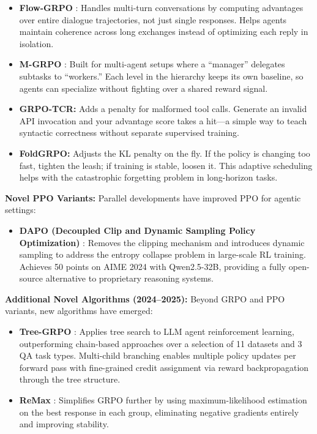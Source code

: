 \documentclass[12pt,a4paper]{report}
\theoremstyle{definition}
\begin{document}
\begin{itemize}
    \item \textbf{Flow-GRPO} \cite{li2025flowgrpo}: Handles multi-turn conversations by computing advantages over entire dialogue trajectories, not just single responses. Helps agents maintain coherence across long exchanges instead of optimizing each reply in isolation.

    \item \textbf{M-GRPO} \cite{hong2025mgrpo}: Built for multi-agent setups where a ``manager'' delegates subtasks to ``workers.'' Each level in the hierarchy keeps its own baseline, so agents can specialize without fighting over a shared reward signal.

    \item \textbf{GRPO-TCR:} Adds a penalty for malformed tool calls. Generate an invalid API invocation and your advantage score takes a hit---a simple way to teach syntactic correctness without separate supervised training.

    \item \textbf{FoldGRPO:} Adjusts the KL penalty on the fly. If the policy is changing too fast, tighten the leash; if training is stable, loosen it. This adaptive scheduling helps with the catastrophic forgetting problem in long-horizon tasks.
\end{itemize}

\noindent\textbf{Novel PPO Variants:} Parallel developments have improved PPO for agentic settings:
\begin{itemize}
    \item \textbf{DAPO (Decoupled Clip and Dynamic Sampling Policy Optimization)} \cite{bytedance2025dapo}: Removes the clipping mechanism and introduces dynamic sampling to address the entropy collapse problem in large-scale RL training. Achieves 50 points on AIME 2024 with Qwen2.5-32B, providing a fully open-source alternative to proprietary reasoning systems.
\end{itemize}

\noindent\textbf{Additional Novel Algorithms (2024--2025):} Beyond GRPO and PPO variants, new algorithms have emerged:
\begin{itemize}
    \item \textbf{Tree-GRPO} \cite{ji2025treegrpo}: Applies tree search to LLM agent reinforcement learning, outperforming chain-based approaches over a selection of 11 datasets and 3 QA task types.
 Multi-child branching enables multiple policy updates per forward pass with fine-grained credit assignment via reward backpropagation through the tree structure.

    \item \textbf{ReMax} \cite{li2024remax}: Simplifies GRPO further by using maximum-likelihood estimation on the best response in each group, eliminating negative gradients entirely and improving stability.
\end{itemize}
\end{document}
